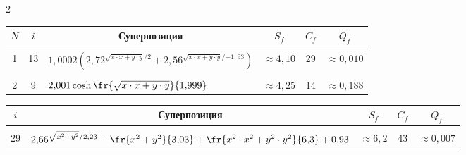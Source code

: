 \begin{multicols}{2}
\begin{table}
\begin{center}
\begin{tabular}{| c | c | l | c | c | c |} 
  \hline
    $N$ & $i$   & \multicolumn{1}{c|}{Суперпозиция}  & $S_f$                & $C_f$ & $Q_f$             \\ 
    \hline
    &&&&&\\[-9pt]
    1   & 13    & $ 1{,}0002 \left(2{,}72^{\sqrt{x \cdot x + y \cdot y}/2} + 
    2{,}56^{\sqrt{x \cdot x + y \cdot y}/{-1{,}93}}\right)$ & 
    $\approx 4{,}10$     & 29    & $\approx 0{,}010$    \\ 
    \hline
    &&&&&\\[-9pt]
    2   & \hphantom{9}9     & $ 2{,}001 \cosh \fr{\sqrt{x \cdot x + y \cdot y}}{1{,}999}$& 
    $\approx 4{,}25$   & 14    & $\approx 0{,}188$   \\ 
    \hline
  \end{tabular}
  \end{center}
\end{table}

\begin{table}\small
\begin{center}
  \label{tabl:results_Z}
  \vspace{2ex}
  
  \begin{tabular}{| c | c | c | c | c |} 
  \hline
    $i$ & Суперпозиция  & $S_f$                & $C_f$ & $Q_f$             \\ 
    \hline
    &&&&\\[-9pt]
    29  & $ 2{,}66^{\sqrt{x^2 + y^2}/{2{,}23}} - 
    \fr{x^2 + y^2}{3{,}03} + \fr{x^2 \cdot x^2 + y^2\cdot  y^2}{6{,}3} + 0{,}93$
             & $\approx 6{,}2$     & 43    & $ \approx 0{,}007 $ \\ 
             \hline
  \end{tabular}
  \end{center}
\end{table}

\begin{figure} %
\vspace*{1pt}
 \begin{center}
 \mbox{%
 \epsfxsize=160.163mm
 }
 \end{center}
 \vspace*{-9pt}
\end{figure}
\begin{figure} %
\vspace*{-3pt}
 \begin{center}
 \mbox{%
 \epsfxsize=160.163mm
 }
 \end{center}
 \vspace*{-11pt}
\end{figure}


\end{multicols}
